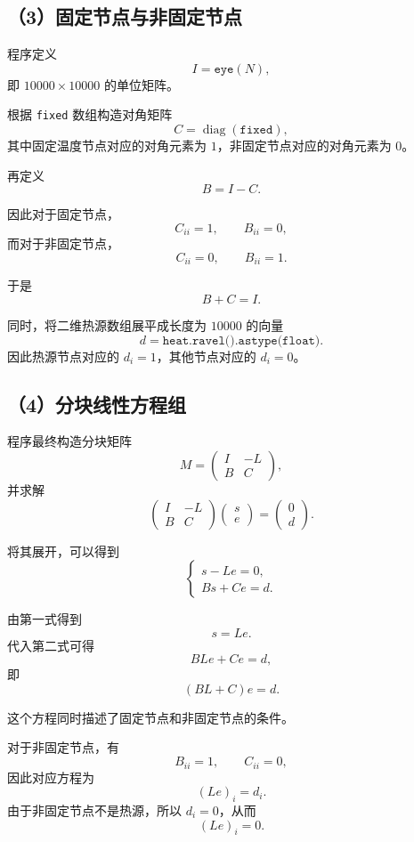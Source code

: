 \documentclass[UTF8,a4paper,11pt,fontset=fandol]{ctexart}
\begin{document}
\subsection*{（3）固定节点与非固定节点}

程序定义
\[
I=\texttt{eye}(N),
\]
即 $10000\times10000$ 的单位矩阵。

根据 \texttt{fixed} 数组构造对角矩阵
\[
C=\operatorname{diag}(\texttt{fixed}),
\]
其中固定温度节点对应的对角元素为 $1$，非固定节点对应的对角元素为
$0$。

再定义
\[
B=I-C.
\]

因此对于固定节点，
\[
C_{ii}=1,\qquad B_{ii}=0,
\]
而对于非固定节点，
\[
C_{ii}=0,\qquad B_{ii}=1.
\]

于是
\[
\boxed{B+C=I}.
\]

同时，将二维热源数组展平成长度为 $10000$ 的向量
\[
d=\texttt{heat.ravel().astype(float)}.
\]
因此热源节点对应的 $d_i=1$，其他节点对应的 $d_i=0$。


\subsection*{（4）分块线性方程组}

程序最终构造分块矩阵
\[
M=
\begin{pmatrix}
I&-L\\
B&C
\end{pmatrix},
\]
并求解
\[
\boxed{
\begin{pmatrix}
I&-L\\
B&C
\end{pmatrix}
\begin{pmatrix}
s\\
e
\end{pmatrix}
=
\begin{pmatrix}
0\\
d
\end{pmatrix}.
}
\]

将其展开，可以得到
\[
\begin{cases}
s-Le=0,\\
Bs+Ce=d.
\end{cases}
\]

由第一式得到
\[
s=Le.
\]
代入第二式可得
\[
BLe+Ce=d,
\]
即
\[
\boxed{(BL+C)e=d}.
\]

这个方程同时描述了固定节点和非固定节点的条件。

对于非固定节点，有
\[
B_{ii}=1,\qquad C_{ii}=0,
\]
因此对应方程为
\[
(Le)_i=d_i.
\]
由于非固定节点不是热源，所以 $d_i=0$，从而
\[
\boxed{(Le)_i=0}.
\]
\end{document}
